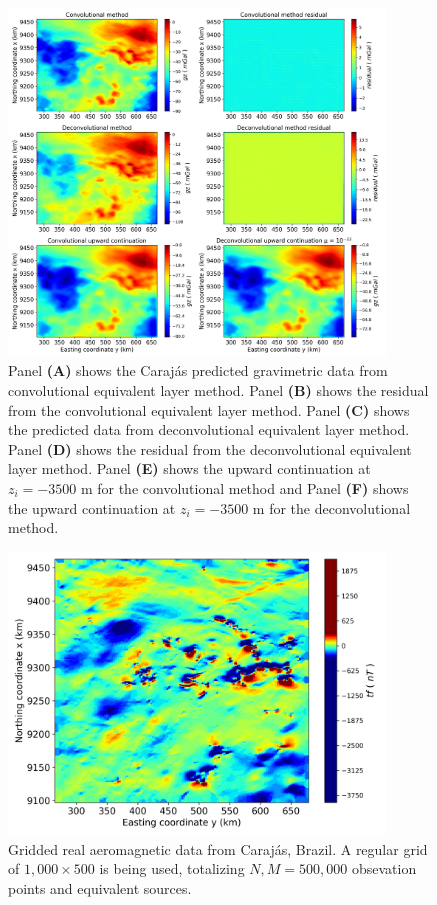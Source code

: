 \begin{figure}[htbp]
	\begin{center}
		\includegraphics[width=10cm]{Fig/carajas_gz_predito_1000x500}
	\end{center}
	\caption{Panel \textbf{(A)} shows the Carajás predicted gravimetric data from convolutional equivalent layer method. Panel \textbf{(B)} shows the residual from the convolutional equivalent layer method. Panel \textbf{(C)} shows the predicted data from deconvolutional equivalent layer method. Panel \textbf{(D)} shows the residual from the deconvolutional equivalent layer method. Panel \textbf{(E)} shows the upward continuation at $z_i = -3500$ m for the convolutional method and Panel \textbf{(F)} shows the upward continuation at $z_i = -3500$ m for the deconvolutional method.}
	\label{fig:10}
\end{figure}

\begin{figure}[htbp]
	\begin{center}
		\includegraphics[width=10cm]{Fig/carajas_tf_real_data_1000x500}
	\end{center}
	\caption{Gridded real aeromagnetic data from Carajás, Brazil. A regular grid of $1,000 \times 500$ is being used, totalizing $N,M = 500, 000$ obsevation points and equivalent sources.}
	\label{fig11}
\end{figure}

